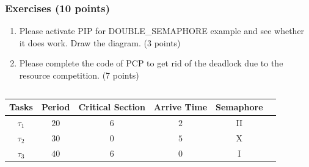 \documentclass[t]{beamer}
\begin{document}
\begin{frame}
\frametitle{Exercises (10 points)}
\begin{enumerate}
\item Please activate PIP for DOUBLE\_SEMAPHORE example and see whether it does work. Draw the diagram. (3 points)
\item Please complete the code of PCP to get rid of the deadlock due to the resource competition. (7 points)
\end{enumerate}
\begin{columns}
    \column{\textwidth}
  \begin{table}
    \centering
    \begin{tabular}{|c|c|c|c|c|c|}
      \hline
     Tasks & Period & Critical Section & Arrive Time & Semaphore\\
     \hline
     $\tau_1$ & $20$ & $6$ & $2$ & II\\
     \hline
     $\tau_2$ & $30$ & $0$ & $5$ & X\\
     \hline
     $\tau_3$ & $40$ & $6$ & $0$ & I\\
     \hline
    \end{tabular}
  \end{table}
  \end{columns}
\end{frame}
\end{document}
